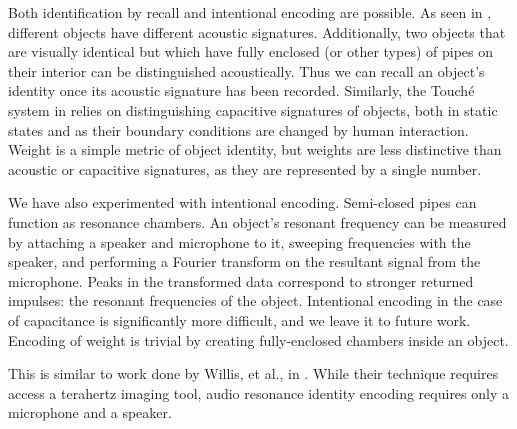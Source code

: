 Both identification by recall and intentional encoding are possible.  As seen in \cite{Ono-touchandactivate}, different objects have different acoustic signatures.  Additionally, two objects that are visually identical but which have fully enclosed (or other types) of pipes on their interior can be distinguished acoustically.  Thus we can recall an object's identity once its acoustic signature has been recorded.  Similarly, the Touch\'{e} system in \cite{Sato-touche} relies on distinguishing capacitive signatures of objects, both in static states and as their boundary conditions are changed by human interaction.  Weight is a simple metric of object identity, but weights are less distinctive than acoustic or capacitive signatures, as they are represented by a single number.

We have also experimented with intentional encoding.  Semi-closed pipes can function as resonance chambers.  An object's resonant frequency can be measured by attaching a speaker and microphone to it, sweeping frequencies with the speaker, and performing a Fourier transform on the resultant signal from the microphone.  Peaks in the transformed data correspond to stronger returned impulses: the resonant frequencies of the object.  Intentional encoding in the case of capacitance is significantly more difficult, and we leave it to future work.  Encoding of weight is trivial by creating fully-enclosed chambers inside an object.

This is similar to work done by Willis, et al., in \cite{Willis-infrastructs}.  While their technique requires access a terahertz imaging tool, audio resonance identity encoding requires only a microphone and a speaker.

